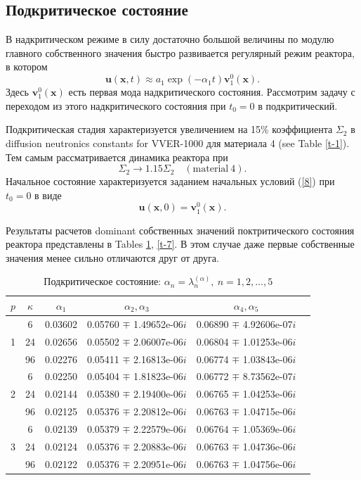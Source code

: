 \documentclass[authoryear]{elsarticle}
\begin{document}
\subsection{Подкритическое состояние} 

В надкритическом режиме в силу достаточно большой величины по модулю главного собственного значения
быстро развивается регулярный режим реактора, в котором 
\[
 \bm u (\bm x, t) \approx a_1 \exp(-\alpha_1 t) \bm v_1^0 (\bm x) .
\] 
Здесь $\bm v_1^0 (\bm x)$ есть первая мода надкритического состояния.
Рассмотрим задачу с переходом из этого надкритического состояния при $t_0 = 0$  в подкритический.

Подкритическая стадия характеризуется увеличением на  15\% коэффициента 
$\Sigma_2$ в diffusion neutronics constants for VVER-1000  для материала 4 (see Table \ref{t-1}). 
Тем самым рассматривается динамика реактора при 
\[
 \Sigma_2 \longrightarrow 1.15 \Sigma_2 \quad (\mathrm{material} \ 4).
\] 
Начальное состояние характеризуется заданием начальных условий (\ref{8}) 
при $t_0 = 0$ в виде
\begin{equation}\label{25}
 \bm u (\bm x, 0) = \bm v_1^0 (\bm x) . 
\end{equation} 

Результаты расчетов dominant собственных значений поктритического состояния реактора
представлены в Tables \ref{t-6}, \ref{t-7}. В этом случае даже первые 
собственные значения менее сильно отличаются друг от друга. 

\begin{table}[h]
\caption{Подкритическое состояние: $\alpha_n = \lambda_n^{(\alpha )}, \ n = 1,2, ..., 5$}
\label{t-6}
\begin{center}
\begin{tabular}{cccccc}
\hline
$p$ & $\kappa$ & $\alpha_1$ &  $\alpha_2, \alpha_3$ &  $\alpha_4, \alpha_5$ \\ 
\hline
   & 6 & 0.03602 & 0.05760 $\mp$ 1.49652e-06$i$ & 0.06890 $\mp$ 4.92606e-07$i$ \\ 
1 & 24 & 0.02656 & 0.05502 $\mp$ 2.06007e-06$i$ & 0.06804 $\mp$ 1.01253e-06$i$ \\ 
  & 96 & 0.02276 & 0.05411 $\mp$ 2.16813e-06$i$ & 0.06774 $\mp$ 1.03843e-06$i$ \\ 
\hline
   & 6 & 0.02250 & 0.05404 $\mp$ 1.81823e-06$i$ & 0.06772 $\mp$ 8.73562e-07$i$ \\ 
2 & 24 & 0.02144 & 0.05380 $\mp$ 2.19400e-06$i$ & 0.06765 $\mp$ 1.04253e-06$i$ \\ 
  & 96 & 0.02125 & 0.05376 $\mp$ 2.20812e-06$i$ & 0.06763 $\mp$ 1.04715e-06$i$ \\ 
\hline
   & 6 & 0.02139 & 0.05379 $\mp$ 2.22579e-06$i$ & 0.06764 $\mp$ 1.05369e-06$i$ \\ 
3 & 24 & 0.02124 & 0.05376 $\mp$ 2.20883e-06$i$ & 0.06763 $\mp$ 1.04736e-06$i$ \\ 
  & 96 & 0.02122 & 0.05376 $\mp$ 2.20951e-06$i$ & 0.06763 $\mp$ 1.04756e-06$i$ \\ 
\hline
\end{tabular}
\end{center}
\end{table}
\end{document}
